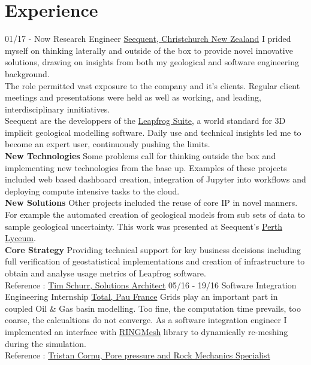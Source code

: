 \documentclass[]{friggeri-cv}
\begin{document}
\section{Experience}
\begin{entrylist}
  \entry
    {01/17 - Now}
    {Research Engineer}
    {\href{https://www.seequent.com/}{Seequent, Christchurch New Zealand}}
    {I prided myself on thinking laterally and outside of the box to provide novel innovative solutions, drawing on insights from both my geological and software engineering background.
    \\[3pt]
    The role permitted vast exposure to the company and it's clients. Regular client meetings and presentations were held as well as working, and leading, interdisciplinary innitiatives.
    \\[3pt]
    Seequent are the developpers of the \href{https://www.leapfrog3d.com/}{Leapfrog Suite}, a world standard for 3D implicit geological modelling software. Daily use and technical insights led me to become an expert user, continuously pushing the limits.
    \\[6pt]
   	\textbf{New Technologies} Some problems call for thinking outside the box and implementing new technologies from the base up. Examples of these projects included web based dashboard creation, integration of Jupyter into workflows and deploying compute intensive tasks to the cloud.
   	\\[6pt]
   	\textbf{New Solutions} Other projects included the reuse of core IP in novel manners. For example the automated creation of geological models from sub sets of data to sample geological uncertainty. This work was presented at Seequent's \href{https://lyceum-perth.seequent.com/}{Perth Lyceum}.
    \\[6pt]
   	\textbf{Core Strategy} Providing technical support for key business decisions including full verification of geostatistical implementations and creation of infrastructure to obtain and analyse usage metrics of Leapfrog software. 
    \\
    Reference : \href{mailto:tim.schurr@seequent.com}{Tim Schurr, Solutions Architect}
	}
  \entry
    {05/16 - 19/16}
    {Software Integration Engineering Internship}
    {\href{https://www.total.com/en}{Total, Pau France}}
    {Grids play an important part in coupled Oil \& Gas basin modelling. Too fine, the computation time prevails, too coarse, the calcualtions do not converge. As a software integration engineer I implemented an interface with \href{http://www.ring-team.org/software/ringmesh}{RINGMesh} library to dynamically re-meshing during the simulation.\\ Reference : \href{mailto:tristan.cornu@total.com}{Tristan Cornu, Pore pressure and Rock Mechanics Specialist}}
    \end{entrylist}
    
\end{document}
